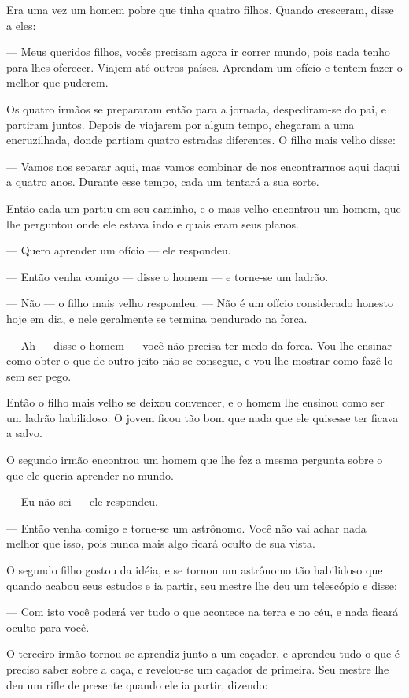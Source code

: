 Era uma vez um homem pobre que tinha quatro filhos. Quando cresceram,
disse a eles:

— Meus queridos filhos, vocês precisam agora ir correr mundo, pois
nada tenho para lhes oferecer. Viajem até outros países. Aprendam um
ofício e tentem fazer o melhor que puderem. 

Os quatro irmãos se prepararam então para a jornada, despediram-se do
pai, e partiram juntos. Depois de viajarem por algum tempo, chegaram
a uma encruzilhada, donde partiam quatro estradas diferentes. O filho
mais velho disse:

— Vamos nos separar aqui, mas vamos combinar de nos encontrarmos aqui
daqui a quatro anos. Durante esse tempo, cada um tentará a sua sorte.

Então cada um partiu em seu caminho, e o mais velho encontrou um
homem, que lhe perguntou onde ele estava indo e quais eram seus
planos.

— Quero aprender um ofício — ele respondeu.

— Então venha comigo — disse o homem — e torne-se um ladrão.

— Não — o filho mais velho respondeu. — Não é um ofício considerado
honesto hoje em dia, e nele geralmente se termina pendurado na forca.


— Ah — disse o homem — você não precisa ter medo da forca. Vou lhe
ensinar como obter o que de outro jeito não se consegue, e vou lhe
mostrar como fazê-lo sem ser pego. 

Então o filho mais velho se deixou convencer, e o homem lhe ensinou
como ser um ladrão habilidoso. O jovem ficou tão bom que nada que ele
quisesse ter ficava a salvo. 

O segundo irmão encontrou um homem que lhe fez a mesma pergunta sobre
o que ele queria aprender no mundo. 

— Eu não sei — ele respondeu. 

— Então venha comigo e torne-se um astrônomo. Você não vai achar nada
melhor que isso, pois nunca mais algo ficará oculto de sua vista.

O segundo filho gostou da idéia, e se tornou um astrônomo tão
habilidoso que quando acabou seus estudos e ia partir, seu mestre lhe
deu um telescópio e disse:

— Com isto você poderá ver tudo o que acontece na terra e no céu, e
nada ficará oculto para você.

O terceiro irmão tornou-se aprendiz junto a um caçador, e aprendeu
tudo o que é preciso saber sobre a caça, e revelou-se um caçador de
primeira. Seu mestre lhe deu um rifle de presente quando ele ia
partir, dizendo:

